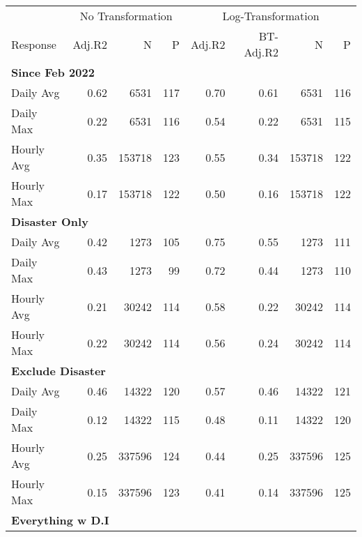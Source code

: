 
\begin{tabular}{l|r|r|r|r|r|r|r}
\hline
\multicolumn{1}{c|}{ } & \multicolumn{3}{c|}{No Transformation} & \multicolumn{4}{c}{Log-Transformation} \\
\cline{2-4} \cline{5-8}
Response & Adj.R2 & N & P & Adj.R2 & BT-Adj.R2 & N & P\\
\hline
\multicolumn{8}{l}{\textbf{Since Feb 2022}}\\
\hline
\hspace{1em}Daily Avg & 0.62 & 6531 & 117 & 0.70 & 0.61 & 6531 & 116\\
\hline
\hspace{1em}Daily Max & 0.22 & 6531 & 116 & 0.54 & 0.22 & 6531 & 115\\
\hline
\hspace{1em}Hourly Avg & 0.35 & 153718 & 123 & 0.55 & 0.34 & 153718 & 122\\
\hline
\hspace{1em}Hourly Max & 0.17 & 153718 & 122 & 0.50 & 0.16 & 153718 & 122\\
\hline
\multicolumn{8}{l}{\textbf{Disaster Only}}\\
\hline
\hspace{1em}Daily Avg & 0.42 & 1273 & 105 & 0.75 & 0.55 & 1273 & 111\\
\hline
\hspace{1em}Daily Max & 0.43 & 1273 & 99 & 0.72 & 0.44 & 1273 & 110\\
\hline
\hspace{1em}Hourly Avg & 0.21 & 30242 & 114 & 0.58 & 0.22 & 30242 & 114\\
\hline
\hspace{1em}Hourly Max & 0.22 & 30242 & 114 & 0.56 & 0.24 & 30242 & 114\\
\hline
\multicolumn{8}{l}{\textbf{Exclude Disaster}}\\
\hline
\hspace{1em}Daily Avg & 0.46 & 14322 & 120 & 0.57 & 0.46 & 14322 & 121\\
\hline
\hspace{1em}Daily Max & 0.12 & 14322 & 115 & 0.48 & 0.11 & 14322 & 120\\
\hline
\hspace{1em}Hourly Avg & 0.25 & 337596 & 124 & 0.44 & 0.25 & 337596 & 125\\
\hline
\hspace{1em}Hourly Max & 0.15 & 337596 & 123 & 0.41 & 0.14 & 337596 & 125\\
\hline
\multicolumn{8}{l}{\textbf{Everything w D.I}}\\

\end{tabular}
